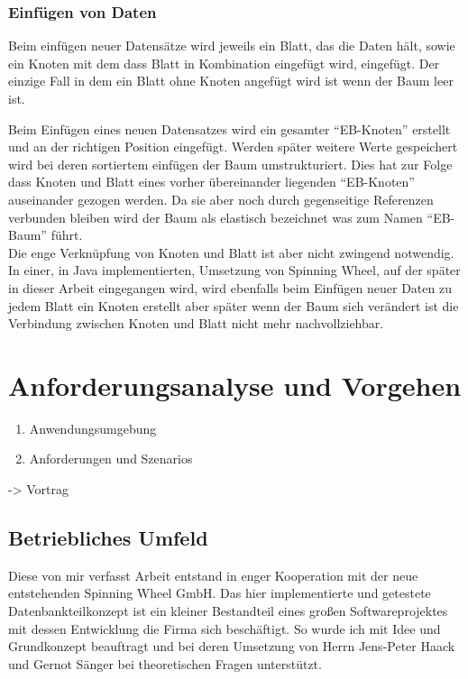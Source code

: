 \documentclass[a4paper,11pt,oneside,%
headsepline,												%
footsepline,												%
bibtotocnumbered									%
]{scrreprt}
\begin{document}
\subsection{Einfügen von Daten}
Beim einfügen neuer Datensätze wird jeweils ein Blatt, das die Daten hält, sowie ein Knoten mit dem dass Blatt in Kombination eingefügt wird, eingefügt. Der einzige Fall in dem ein Blatt ohne Knoten angefügt wird ist wenn der Baum leer ist.

Beim Einfügen eines neuen Datensatzes wird ein gesamter \enquote{EB-Knoten} erstellt und an der richtigen Position eingefügt. Werden später weitere Werte gespeichert wird bei deren sortiertem einfügen der Baum umstrukturiert. Dies hat zur Folge dass Knoten und Blatt eines vorher übereinander liegenden \enquote{EB-Knoten} auseinander gezogen werden. Da sie aber noch durch gegenseitige Referenzen verbunden bleiben wird der Baum als elastisch bezeichnet was zum Namen \enquote{\ac{EB-Baum}} führt.\\
Die enge Verknüpfung von Knoten und Blatt ist aber nicht zwingend notwendig. In einer, in Java implementierten, Umsetzung von Spinning Wheel, auf der später in dieser Arbeit eingegangen wird, wird ebenfalls beim Einfügen neuer Daten zu jedem Blatt ein Knoten erstellt aber später wenn der Baum sich verändert ist die Verbindung zwischen Knoten und Blatt nicht mehr nachvollziehbar.


 
\chapter{Anforderungsanalyse und Vorgehen}
\begin{enumerate}[1.]
			\item Anwendungsumgebung
			\item Anforderungen und Szenarios
		\end{enumerate}
-> Vortrag

\section{Betriebliches Umfeld}
Diese von mir verfasst Arbeit entstand in enger Kooperation mit der neue entstehenden Spinning Wheel GmbH. Das hier implementierte und getestete Datenbankteilkonzept ist ein kleiner Bestandteil eines großen Softwareprojektes mit dessen Entwicklung die Firma sich beschäftigt. So wurde ich mit Idee und Grundkonzept beauftragt und bei deren Umsetzung von Herrn Jens-Peter Haack und Gernot Sänger bei theoretischen Fragen unterstützt.\\
\end{document}
